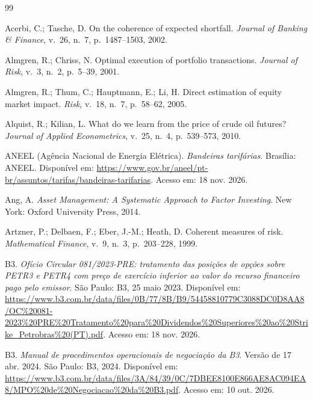 \begin{thebibliography}{99}

Acerbi, C.; Tasche, D. On the coherence of expected shortfall. \emph{Journal of Banking \& Finance}, v.~26, n.~7, p.~1487--1503, 2002.

Almgren, R.; Chriss, N. Optimal execution of portfolio transactions. \emph{Journal of Risk}, v.~3, n.~2, p.~5--39, 2001.

Almgren, R.; Thum, C.; Hauptmann, E.; Li, H. Direct estimation of equity market impact. \emph{Risk}, v.~18, n.~7, p.~58--62, 2005.

Alquist, R.; Kilian, L. What do we learn from the price of crude oil futures? \emph{Journal of Applied Econometrics}, v.~25, n.~4, p.~539--573, 2010.

ANEEL (Agência Nacional de Energia Elétrica). \emph{Bandeiras tarifárias}. Brasília: ANEEL. Disponível em: \url{https://www.gov.br/aneel/pt-br/assuntos/tarifas/bandeiras-tarifarias}. Acesso em: 18 nov. 2026.

Ang, A. \emph{Asset Management: A Systematic Approach to Factor Investing}. New York: Oxford University Press, 2014.

Artzner, P.; Delbaen, F.; Eber, J.-M.; Heath, D. Coherent measures of risk. \emph{Mathematical Finance}, v.~9, n.~3, p.~203--228, 1999.

B3. \emph{Ofício Circular 081/2023-PRE: tratamento das posições de opções sobre PETR3 e PETR4 com preço de exercício inferior ao valor do recurso financeiro pago pelo emissor}. São Paulo: B3, 25 maio 2023. Disponível em: \url{https://www.b3.com.br/data/files/0B/77/8B/B9/54458810779C3088DC0D8AA8/OC\%20081-2023\%20PRE\%20Tratamento\%20para\%20Dividendos\%20Superiores\%20ao\%20Strike_Petrobras\%20(PT).pdf}. Acesso em: 18 nov. 2026.

B3. \emph{Manual de procedimentos operacionais de negociação da B3}. Versão de 17 abr. 2024. São Paulo: B3, 2024. Disponível em: \url{https://www.b3.com.br/data/files/3A/84/39/0C/7DBEE8100E866AE8AC094EA8/MPO\%20de\%20Negociacao\%20da\%20B3.pdf}. Acesso em: 10 out. 2026.


\end{thebibliography}
